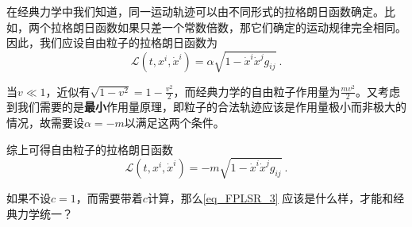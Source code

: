 在经典力学中我们知道，同一运动轨迹可以由不同形式的拉格朗日函数确定。比如，两个拉格朗日函数如果只差一个常数倍数，那它们确定的运动规律完全相同。因此，我们应设自由粒子的拉格朗日函数为
\begin{equation}
\mathcal{L}(t, x^i, \dot{x}^i) = \alpha\sqrt{1-\dot{x}^i\dot{x}^jg_{ij}}~.
\end{equation}

当$v\ll 1$，近似有$\sqrt{1-v^2}=1-\frac{v^2}{2}$，而经典力学的自由粒子作用量为$\frac{mv^2}{2}$。又考虑到我们需要的是\textbf{最小}作用量原理，即粒子的合法轨迹应该是作用量极小而非极大的情况，故需要设$\alpha=-m$以满足这两个条件。

综上可得自由粒子的拉格朗日函数
\begin{equation}\label{eq_FPLSR_3}
\mathcal{L}(t, x^i, \dot{x}^i) = -m\sqrt{1-\dot{x}^i\dot{x}^jg_{ij}}~.
\end{equation}

\begin{exercise}{}
如果不设$c=1$，而需要带着$c$计算，那么\autoref{eq_FPLSR_3} 应该是什么样，才能和经典力学统一？
\end{exercise}
